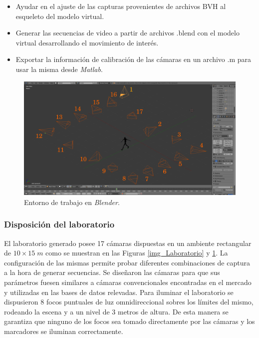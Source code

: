 \begin{itemize}
\item  Ayudar en  el ajuste de las capturas provenientes de archivos BVH al esqueleto del modelo virtual.
\item	Generar las secuencias de video a partir de archivos .blend  con el modelo virtual desarrollando el movimiento de interés.
\item	Exportar la información de calibración de las cámaras en un archivo .m para usar la misma desde \textit{Matlab}.
\end{itemize}


\begin{figure}[ht!]
  \hspace{-1.0cm}
   \includegraphics[scale=0.28]{img/Base_Datos/Entorno_Blender.pdf}
   \caption{Entorno de trabajo en \textit{Blender}.}
  \label{img_Entorno_Blender}
\end{figure}   


\subsubsection*{Disposición del laboratorio}
El laboratorio generado posee 17 cámaras dispuestas en un ambiente rectangular de $10\times15\;m $ como se muestran en las Figuras \ref{img_Laboratorio} y \ref{img_Entorno_Blender}. La configuración de las mismas permite probar diferentes combinaciones de captura a la hora de generar secuencias. Se diseñaron las cámaras para que sus parámetros fuesen similares a cámaras convencionales
 encontradas en el mercado y utilizadas en las bases de datos relevadas. 
Para iluminar el laboratorio se dispusieron $8$ focos puntuales de luz omnidireccional sobres los límites del mismo, rodeando la escena y a un nivel de 3 metros de altura. De esta manera se garantiza que ninguno de los focos sea tomado directamente por las cámaras y los marcadores se iluminan correctamente.
 


